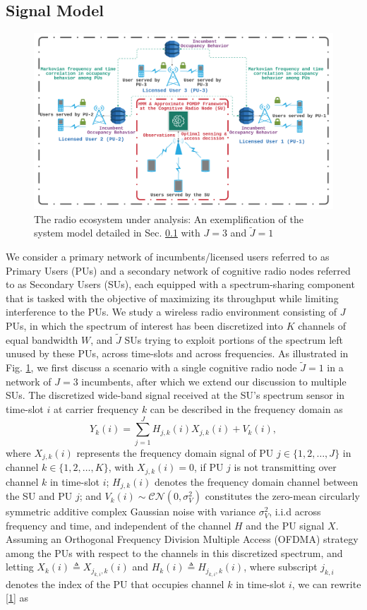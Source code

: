 \documentclass[12pt, draftcls, onecolumn]{IEEEtran}
\begin{document}
\subsection{Signal Model}\label{I.I}
\begin{figure} [htb]
    \centerline{
    \includegraphics[width = 0.8\linewidth]{figures/Minerva_System_Model.png}}
    \caption{The radio ecosystem under analysis: An exemplification of the system model detailed in Sec. \ref{I.I} with $J{=}3$ and $\tilde{J}{=}1$}
    \label{fig: A.0}
\end{figure}
We consider a primary network of incumbents/licensed users referred to as Primary Users (PUs) and a secondary network of cognitive radio nodes referred to as Secondary Users (SUs), each equipped with a spectrum-sharing component that is tasked with the objective of maximizing its throughput while limiting interference to the PUs. We study a wireless radio environment consisting of $J$ PUs, in which the spectrum of interest has been discretized into $K$ channels of equal bandwidth $W$, and $\tilde{J}$ SUs trying to exploit portions of the spectrum left unused by these PUs, across time-slots and across frequencies. As illustrated in Fig. \ref{fig: A.0}, we first discuss a scenario with a single cognitive radio node $\tilde{J}{=}1$ in a network of $J{=}3$ incumbents, after which we extend our discussion to multiple SUs. The discretized wide-band signal received at the SU's spectrum sensor in time-slot $i$ at carrier frequency $k$ can be described in the frequency domain as
\begin{equation}\label{1}
    Y_{k}(i)=\sum_{j{=}1}^{J}{H_{j,k}(i)X_{j,k}(i)+V_{k}(i)},
\end{equation}
where $X_{j,k}(i)$ represents the frequency domain signal of PU $j{\in}\{1,2,\dots,J\}$ in channel $k \in \{1,2,\dots,K\}$, with $X_{j,k}(i){=}0$, if PU $j$ is not transmitting over channel $k$ in time-slot $i$; $H_{j,k}(i)$ denotes the frequency domain channel between the SU and PU $j$; and $V_{k}(i){\sim}\mathcal{CN}(0,\sigma_{V}^{2})$ constitutes the zero-mean circularly symmetric additive complex Gaussian noise with variance $\sigma_{V}^{2}$, i.i.d across frequency and time, and independent of the channel $H$ and the PU signal $X$. Assuming an Orthogonal Frequency Division Multiple Access (OFDMA) strategy among the PUs with respect to the channels in this discretized spectrum, and letting $X_{k}(i){\triangleq}X_{j_{k,i},k}(i)$ and $H_{k}(i){\triangleq}H_{j_{k,i},k}(i)$, where subscript $j_{k,i}$ denotes the index of the PU that occupies channel $k$ in time-slot $i$, we can rewrite \eqref{1} as
\end{document}
